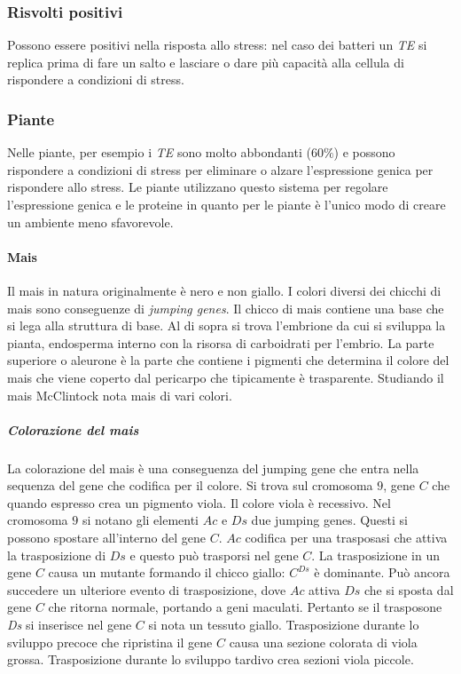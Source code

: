 		\subsubsection{Risvolti positivi}
		Possono essere positivi nella risposta allo stress: nel caso dei batteri un \emph{TE} si replica prima di fare un salto e lasciare o dare pi\`u capacit\`a alla cellula di rispondere a condizioni di stress.
		\subsubsection{Piante}
		Nelle piante, per esempio i \emph{TE} sono molto abbondanti ($60\%$) e possono rispondere a condizioni di stress per eliminare o alzare l'espressione genica per rispondere allo stress.
		Le piante utilizzano questo sistema per regolare l'espressione genica e le proteine in quanto per le piante \`e l'unico modo di creare un ambiente meno sfavorevole.
			
			\paragraph{Mais}
			Il mais in natura originalmente \`e nero e non giallo.
			I colori diversi dei chicchi di mais sono conseguenze di \emph{jumping genes}.
			Il chicco di mais contiene una base che si lega alla struttura di base.
			Al di sopra si trova l'embrione da cui si sviluppa la pianta, endosperma interno con la risorsa di carboidrati per l'embrio.
			La parte superiore o aleurone \`e la parte che contiene i pigmenti che determina il colore del mais che viene coperto dal pericarpo che tipicamente \`e trasparente.
			Studiando il mais McClintock nota mais di vari colori.

				\subparagraph{Colorazione del mais}
				La colorazione del mais \`e una conseguenza del jumping gene che entra nella sequenza del gene che codifica per il colore. 
				Si trova sul cromosoma $9$, gene $C$ che quando espresso crea un pigmento viola.
				Il colore viola \`e recessivo.
				Nel cromosoma $9$ si notano gli elementi $Ac$ e $Ds$ due jumping genes.
				Questi si possono spostare all'interno del gene $C$.
				$Ac$ codifica per una trasposasi che attiva la trasposizione di $Ds$ e questo pu\`o trasporsi nel gene $C$.
				La trasposizione in un gene $C$ causa un mutante formando il chicco giallo: $C^{Ds}$ \`e dominante.
				Pu\`o ancora succedere un ulteriore evento di trasposizione, dove $Ac$ attiva $Ds$ che si sposta dal gene $C$ che ritorna normale, portando a geni maculati.
				Pertanto se il trasposone \emph{Ds} si inserisce nel gene $C$ si nota un tessuto giallo.
				Trasposizione durante lo sviluppo precoce che ripristina il gene $C$ causa una sezione colorata di viola grossa.
				Trasposizione durante lo sviluppo tardivo crea sezioni viola piccole.
	
